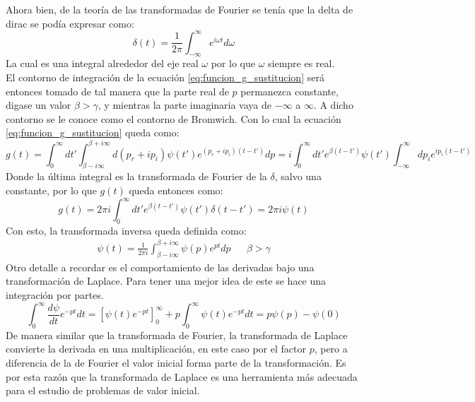 \documentclass[../tesis_main_file.tex]{subfiles}
\begin{document}
Ahora bien, de la teoría de las transformadas de Fourier se tenía que la delta de dirac se podía expresar como:
\begin{equation}
\label{eq:delta_fourier}
\delta(t) =\frac{1}{2\pi}\int ^{\infty}_{- \infty} e^{i \omega t} d \omega
\end{equation}
La cual es una integral alrededor del eje real $ \omega$ por lo que $\omega$ siempre es real.\\
El contorno de integración de la ecuación \ref{eq:funcion_g_sustitucion} será entonces tomado de tal manera que la parte real de $p$ permanezca constante, digase un valor $\beta > \gamma$, y mientras la parte imaginaria vaya de $- \infty$ a $\infty$. A dicho contorno se le conoce como el contorno de Bromwich.\cite{bellan2008fundamentals,arfken2011mathematical} 
Con lo cual la ecuación \ref{eq:funcion_g_sustitucion} queda como:
\begin{equation}
g(t) = \int _0^{\infty} dt' \int ^{\beta +i \infty}_{\beta - i\infty}d(p_r + ip_i) \psi (t')e^{(p_r + ip_i)(t-t')}dp = i \int _0^{\infty} dt' e^{\beta (t-t')} \psi(t') \int ^{\infty}_{-\infty}dp_i e^{ip_i(t-t')}
\end{equation}
Donde la última integral es la transformada de Fourier de la $\delta$, salvo una constante, por lo que $g(t)$ queda entonces como:
\begin{equation}
g(t)= 2 \pi i \int _0^{\infty} dt' e^{\beta (t-t')} \psi(t') \delta(t-t')=2 \pi i \psi (t)
\end{equation}
Con esto, la transformada inversa queda definida como:
\begin{align}
\label{eq:Laplace_inversa}
\psi (t) = \frac{1}{2\pi i} \int ^{\beta +i \infty}_{\beta - i\infty} \psi (p) e^{pt} dp & & \beta > \gamma
\end{align}
Otro detalle a recordar es el comportamiento de las derivadas bajo una transformación de Laplace. Para tener una mejor idea de este se hace una integración por partes.
\begin{equation}
\label{eq:Laplace_transform_derivadas}
\int ^{\infty}_0 \frac{d\psi}{dt}e^{-pt}dt =\left[\psi(t)e^{-pt}\right]^{\infty}_0 +p \int^{\infty}_0\psi(t)e^{-pt}dt= p\psi(p) -\psi(0)
\end{equation}
De manera similar que la transformada de Fourier, la transformada de Laplace convierte la derivada en una multiplicación, en este caso por el factor $p$, pero a diferencia de la de Fourier el valor inicial forma parte de la transformación. Es por esta razón que la transformada de Laplace es una herramienta más adecuada para el estudio de problemas de valor inicial.
\end{document}
